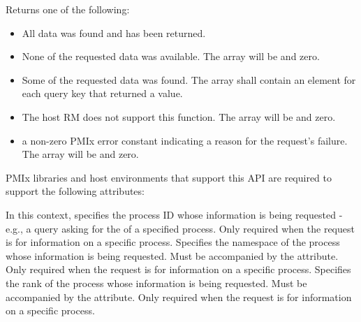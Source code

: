 Returns one of the following:

\begin{itemize}
\item {} All data was found and has been returned.

\item {} None of the requested data was available.
The  array will be  and  zero.
\item {} Some of the requested data was found.
The  array shall contain an element for each query key that returned a value.

\item {} The host \ac{RM} does not support this function. The  array will be  and  zero.

\item a non-zero \ac{PMIx} error constant indicating a reason for the request's failure. The  array will be  and  zero.
\end{itemize}

\reqattrstart
\ac{PMIx} libraries and host environments that support this \ac{API} are required to support the following attributes:

In this context, specifies the process ID whose information is being requested - e.g., a query asking for the  of a specified process. Only required when the request is for information on a specific process.
\pasteAttributeItemEnd
{}Specifies the namespace of the process whose information is being requested. Must be accompanied by the  attribute. Only required when the request is for information on a specific process.
\pasteAttributeItemEnd
{}Specifies the rank of the process whose information is being requested. Must be accompanied by the  attribute. Only required when the request is for information on a specific process.
\pasteAttributeItemEnd
{}

